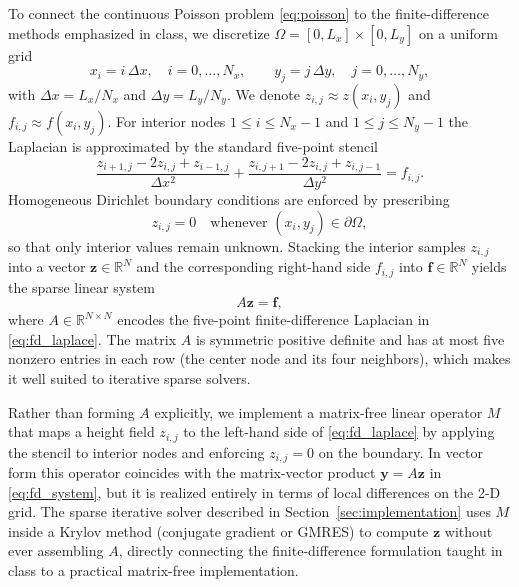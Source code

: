 \documentclass[11pt]{article}
\begin{document}
To connect the continuous Poisson problem \eqref{eq:poisson} to the finite-difference methods emphasized in class, we discretize $\Omega=[0,L_x]\times[0,L_y]$ on a uniform grid
\begin{equation}
x_i = i\,\Delta x,\quad i=0,\dots,N_x,\qquad
y_j = j\,\Delta y,\quad j=0,\dots,N_y,
\end{equation}
with $\Delta x = L_x/N_x$ and $\Delta y=L_y/N_y$. We denote $z_{i,j}\approx z(x_i,y_j)$ and $f_{i,j}\approx f(x_i,y_j)$. For interior nodes $1\le i \le N_x-1$ and $1\le j \le N_y-1$ the Laplacian is approximated by the standard five-point stencil
\begin{equation}
\frac{z_{i+1,j} - 2z_{i,j} + z_{i-1,j}}{\Delta x^2}
+
\frac{z_{i,j+1} - 2z_{i,j} + z_{i,j-1}}{\Delta y^2}
=
f_{i,j}.
\label{eq:fd_laplace}
\end{equation}
Homogeneous Dirichlet boundary conditions are enforced by prescribing
\begin{equation}
z_{i,j} = 0 \quad \text{whenever } (x_i,y_j)\in\partial\Omega,
\end{equation}
so that only interior values remain unknown. Stacking the interior samples $z_{i,j}$ into a vector $\mathbf{z}\in\mathbb{R}^N$ and the corresponding right-hand side $f_{i,j}$ into $\mathbf{f}\in\mathbb{R}^N$ yields the sparse linear system
\begin{equation}
A\mathbf{z} = \mathbf{f},
\label{eq:fd_system}
\end{equation}
where $A\in\mathbb{R}^{N\times N}$ encodes the five-point finite-difference Laplacian in \eqref{eq:fd_laplace}. The matrix $A$ is symmetric positive definite and has at most five nonzero entries in each row (the center node and its four neighbors), which makes it well suited to iterative sparse solvers.

Rather than forming $A$ explicitly, we implement a matrix-free linear operator $M$ that maps a height field $z_{i,j}$ to the left-hand side of \eqref{eq:fd_laplace} by applying the stencil to interior nodes and enforcing $z_{i,j}=0$ on the boundary. In vector form this operator coincides with the matrix-vector product $\mathbf{y}=A\mathbf{z}$ in \eqref{eq:fd_system}, but it is realized entirely in terms of local differences on the 2-D grid. The sparse iterative solver described in Section~\ref{sec:implementation} uses $M$ inside a Krylov method (conjugate gradient or GMRES) to compute $\mathbf{z}$ without ever assembling $A$, directly connecting the finite-difference formulation taught in class to a practical matrix-free implementation.
\end{document}
